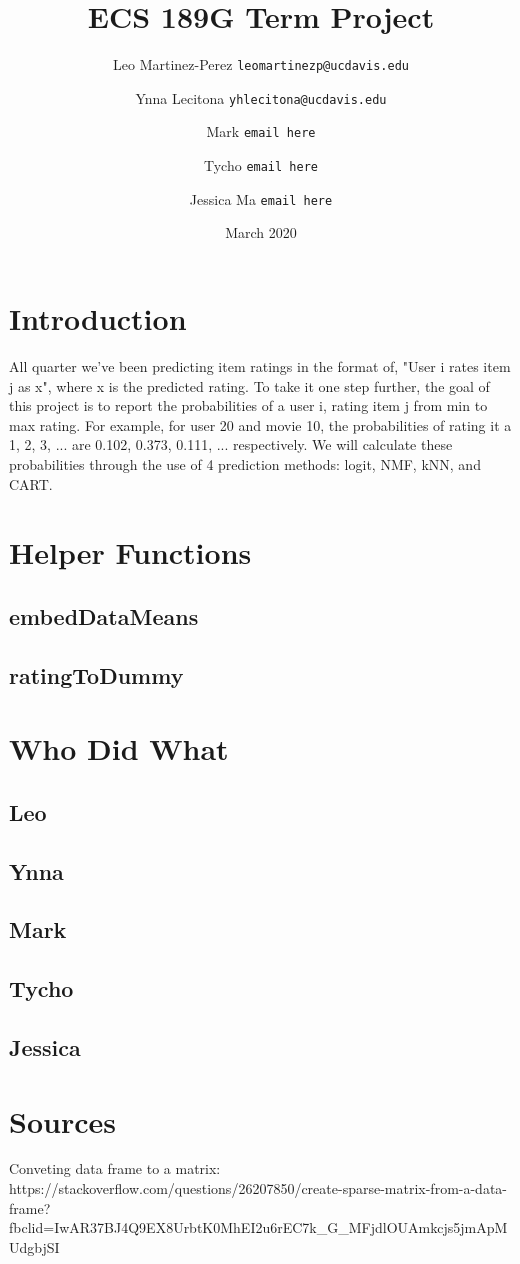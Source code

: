 \documentclass{article}
\title{ECS 189G Term Project}
\author{Leo Martinez-Perez
    \texttt{leomartinezp@ucdavis.edu}
    \and Ynna Lecitona
    \texttt{yhlecitona@ucdavis.edu}
    \and Mark
    \texttt{email here}
    \and Tycho
    \texttt{email here}
    \and Jessica Ma
    \texttt{email here}
}
\date{March 2020}
\begin{document}
\maketitle

\section{Introduction}
All quarter we've been predicting item ratings in the format of, "User i rates item j as x", where x is the predicted rating. To take it one step further, the goal of this project is to report the probabilities of a user i, rating item j from min to max rating. For example, for user 20 and movie 10, the probabilities of rating it a 1, 2, 3, ... are 0.102, 0.373, 0.111, ... respectively. We will calculate these probabilities through the use of 4 prediction methods: logit, NMF, kNN, and CART.

\section{Helper Functions}
\subsection{embedDataMeans}

\subsection{ratingToDummy}

\section{Who Did What}
\subsection{Leo}

\subsection{Ynna}

\subsection{Mark}

\subsection{Tycho}

\subsection{Jessica}

\section{Sources}
Conveting data frame to a matrix: https://stackoverflow.com/questions/26207850/create-sparse-matrix-from-a-data-frame?fbclid=IwAR37BJ4Q9EX8UrbtK0MhEI2u6rEC7k_G_MFjdlOUAmkcjs5jmApMUdgbjSI
\end{document}
